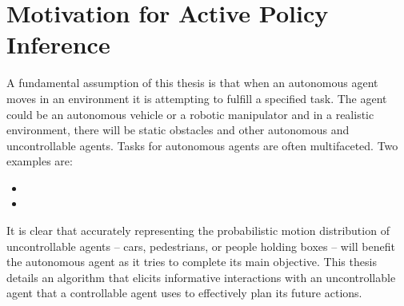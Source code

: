 %
%
\chapter{Motivation for Active Policy Inference}\label{chapt:motivation}

%
%
%
%

    A fundamental assumption of this thesis is that when an autonomous agent moves in an environment it is attempting to
    fulfill a specified task. The agent could be an autonomous vehicle or a robotic manipulator and in a realistic
    environment, there will be static obstacles and other autonomous and uncontrollable agents. Tasks for autonomous
    agents are often multifaceted. Two examples are:
    \begin{itemize}
        \item {}
        \item {}
   \end{itemize}

        It is clear that
    accurately representing the probabilistic motion distribution of uncontrollable agents -- cars, pedestrians, or
    people holding boxes -- will benefit the autonomous agent as it tries to complete its main objective. This thesis
    details an algorithm that elicits informative interactions with an uncontrollable agent that a controllable agent
    uses to effectively plan its future actions.


